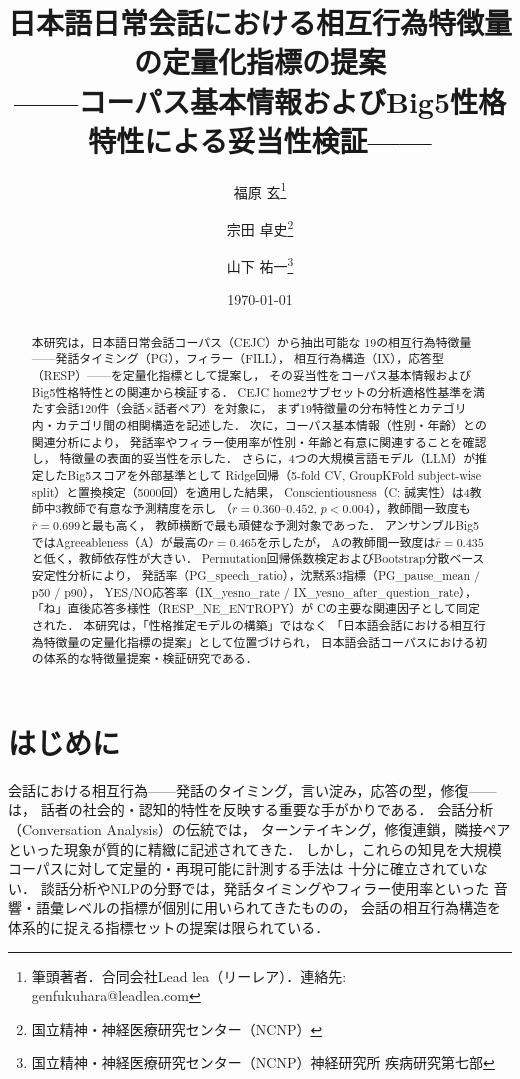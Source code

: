 \documentclass[dvipdfmx,11pt,a4paper]{bxjsarticle}
\title{日本語日常会話における相互行為特徴量の定量化指標の提案\\
——コーパス基本情報およびBig5性格特性による妥当性検証——}
\author{福原 玄\thanks{筆頭著者．合同会社Lead lea（リーレア）．連絡先: genfukuhara@leadlea.com}
\and 宗田 卓史\thanks{国立精神・神経医療研究センター（NCNP）}
\and 山下 祐一\thanks{国立精神・神経医療研究センター（NCNP）神経研究所 疾病研究第七部}}
\date{\today}
\begin{document}
\maketitle

\begin{abstract}
本研究は，日本語日常会話コーパス（CEJC）から抽出可能な
19の相互行為特徴量——発話タイミング（PG），フィラー（FILL），
相互行為構造（IX），応答型（RESP）——を定量化指標として提案し，
その妥当性をコーパス基本情報およびBig5性格特性との関連から検証する．
CEJC home2サブセットの分析適格性基準を満たす会話120件（会話$\times$話者ペア）を対象に，
まず19特徴量の分布特性とカテゴリ内・カテゴリ間の相関構造を記述した．
次に，コーパス基本情報（性別・年齢）との関連分析により，
発話率やフィラー使用率が性別・年齢と有意に関連することを確認し，
特徴量の表面的妥当性を示した．
さらに，4つの大規模言語モデル（LLM）が推定したBig5スコアを外部基準として
Ridge回帰（5-fold CV, GroupKFold subject-wise split）と置換検定（5000回）を適用した結果，
Conscientiousness（C: 誠実性）は4教師中3教師で有意な予測精度を示し
（$r = 0.360$--$0.452$, $p < 0.004$），教師間一致度も$\bar{r} = 0.699$と最も高く，
教師横断で最も頑健な予測対象であった．
アンサンブルBig5ではAgreeableness（A）が最高の$r = 0.465$を示したが，
Aの教師間一致度は$\bar{r} = 0.435$と低く，教師依存性が大きい．
Permutation回帰係数検定およびBootstrap分散ベース安定性分析により，
発話率（PG\_speech\_ratio），沈黙系3指標（PG\_pause\_mean / p50 / p90），
YES/NO応答率（IX\_yesno\_rate / IX\_yesno\_after\_question\_rate），
「ね」直後応答多様性（RESP\_NE\_ENTROPY）が
Cの主要な関連因子として同定された．
本研究は，「性格推定モデルの構築」ではなく
「日本語会話における相互行為特徴量の定量化指標の提案」として位置づけられ，
日本語会話コーパスにおける初の体系的な特徴量提案・検証研究である．
\end{abstract}

\section{はじめに}

会話における相互行為——発話のタイミング，言い淀み，応答の型，修復——は，
話者の社会的・認知的特性を反映する重要な手がかりである．
会話分析（Conversation Analysis）の伝統では，
ターンテイキング，修復連鎖，隣接ペアといった現象が質的に精緻に記述されてきた．
しかし，これらの知見を大規模コーパスに対して定量的・再現可能に計測する手法は
十分に確立されていない．
談話分析やNLPの分野では，発話タイミングやフィラー使用率といった
音響・語彙レベルの指標が個別に用いられてきたものの，
会話の相互行為構造を体系的に捉える指標セットの提案は限られている．
\end{document}
